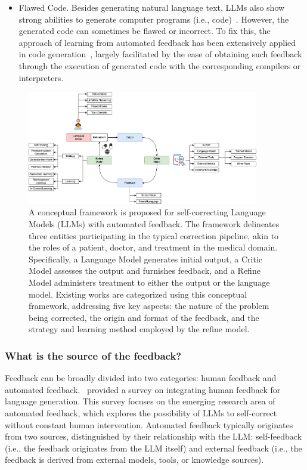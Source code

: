 \documentclass[12pt]{extarticle}
\begin{document}
\begin{itemize}
    \item Flawed Code. Besides generating natural language text, LLMs also show strong abilities to generate computer programs (i.e., code)~\cite{chen2022codet}. However, the generated code can sometimes be flawed or incorrect. To fix this, the approach of learning from automated feedback has been extensively applied in code generation~\cite{chen2023teaching, olausson2023selfrepair}, largely facilitated by the ease of obtaining such feedback through the execution of generated code with the corresponding compilers or interpreters.
\end{itemize}

\begin{figure}[h!]
    \centering
    \includegraphics[width=0.90\textwidth]{img/taxonomy.png}
    \caption{A conceptual framework is proposed for self-correcting Language Models (LLMs) with automated feedback. The framework delineates three entities participating in the typical correction pipeline, akin to the roles of a patient, doctor, and treatment in the medical domain. Specifically, a Language Model generates initial output, a Critic Model assesses the output and furnishes feedback, and a Refine Model administers treatment to either the output or the language model. Existing works are categorized using this conceptual framework, addressing five key aspects: the nature of the problem being corrected, the origin and format of the feedback, and the strategy and learning method employed by the refine model.}\label{fig:taxonomy}
\end{figure}

\subsubsection{What is the source of the feedback?}
Feedback can be broadly divided into two categories: human feedback and automated feedback.~\cite{fernandes2023bridging} provided a survey on integrating human feedback for language generation. This survey focuses on the emerging research area of automated feedback, which explores the possibility of LLMs to self-correct without constant human intervention. Automated feedback typically originates from two sources, distinguished by their relationship with the LLM: self-feedback (i.e., the feedback originates from the LLM itself) and external feedback (i.e., the feedback is derived from external models, tools, or knowledge sources).
\end{document}
